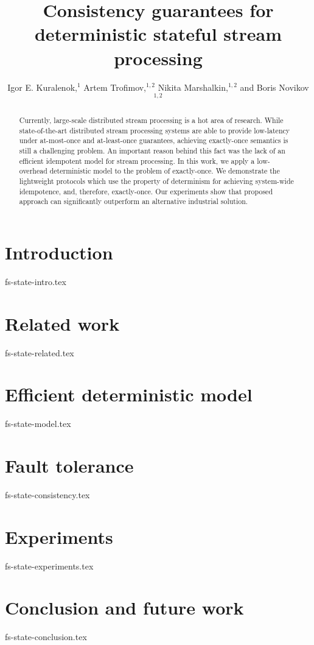 \documentclass[sigconf]{acmart}
\theoremstyle{remark}
\begin{document}
\title {Consistency guarantees for deterministic stateful stream processing}

\author{  Igor E. Kuralenok,$^1$     Artem Trofimov,$^ {1,2}$    Nikita Marshalkin,$^ {1,2}$   and  Boris Novikov$^ {1,2}$ }

\begin{abstract}
Currently, large-scale distributed stream processing is a hot area of research. While state-of-the-art distributed stream processing systems are able to provide low-latency under at-most-once and at-least-once guarantees, achieving exactly-once semantics is still a challenging problem. An important reason behind this fact was the lack of an efficient idempotent model for stream processing. In this work, we apply a low-overhead deterministic model to the problem of exactly-once. We demonstrate the lightweight protocols which use the property of determinism for achieving system-wide idempotence, and, therefore, exactly-once. Our experiments show that proposed approach can significantly outperform an alternative industrial solution.
\end{abstract}

\maketitle

\section {Introduction}
 {fs-state-intro.tex}

\section {Related work}
 {fs-state-related.tex}

\section {Efficient deterministic model}
 {fs-state-model.tex}

\section{Fault tolerance}
 {fs-state-consistency.tex}

\section {Experiments}
 {fs-state-experiments.tex}

\section {Conclusion and future work}
 {fs-state-conclusion.tex}



\end{document}
